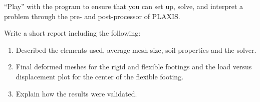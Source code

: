 \documentclass[a4paper,12pt]{article}
\begin{document}
\begin{enumerate}
	``Play'' with the program to ensure that you can set up, solve, and interpret a problem through the pre- and post-processor of PLAXIS.  
	
	Write a short report including the following:
	
	\begin{enumerate}
		\item Described the elements used, average mesh size, soil properties and the solver.
		
		\item Final deformed meshes for the rigid and flexible footings and the load versus displacement plot for the center of the flexible footing.

		\item Explain how the results were validated.
	\end{enumerate}
	
\end{enumerate}
\end{document}
